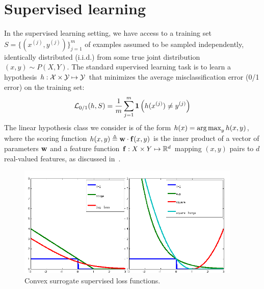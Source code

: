 


\section{Supervised learning}
In the supervised learning setting, we have access to a training set
$S = \{(x^{(j)},y^{(j)})\}_{j=1}^m$ of examples assumed to be sampled 
independently, identically distributed (i.i.d.) from some true joint 
distribution $(x,y) \sim P(X,Y)$. The standard supervised learning task is to 
learn a hypothesis $h: \mathcal{X} \times \mathcal{Y} \mapsto \mathcal{Y}$ that minimizes the average misclassification error (0/1 error) on the training set: 
\begin{align}
\mathcal{L}_{0/1}(h,S) = \frac{1}{m}\sum_{j=1}^m \mathbf{1}\left(h(x^{(j)}) \neq y^{(j)}\right)
\end{align}
The linear hypothesis class we consider is of the form $h(x) = \mathop{\arg\max}_y h(x,y)$, where the
scoring function $h(x,y) \triangleq \mathbf{w} \cdot \mathbf{f}(x,y)$ is the
inner product of a vector of parameters $\mathbf{w}$ and a feature
function $\mathbf{f}: X \times Y \mapsto \mathbb{R}^d$ mapping $(x,y)$ pairs to
$d$ real-valued features, as discussed in~.  

\begin{figure}[tb]
\begin{center}
\includegraphics[width=0.95\textwidth]{figs/losses.png}
\caption[Convex surrogate supervised loss functions.]{Convex surrogate supervised loss functions.}
\label{fig:surrogates}
\end{center}
\end{figure}

